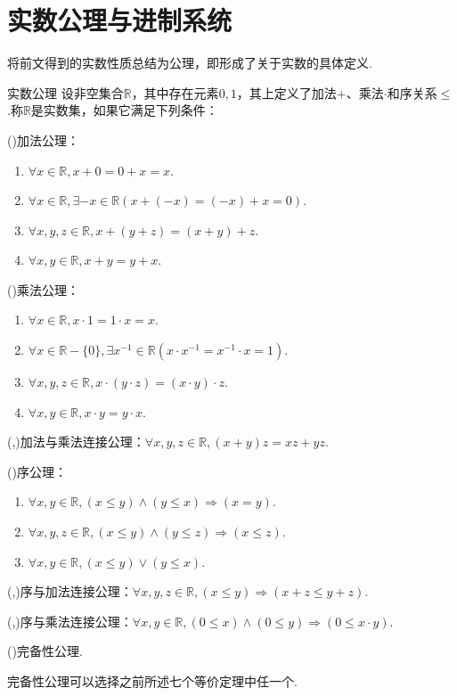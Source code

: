 \documentclass[lang=cn, zihao=5]{elegantbook}
\newcommand{\ssb}[1]{\left( #1 \right)}
\newcommand{\R}{\mathbb{R}}
\begin{document}
\section{实数公理与进制系统}

将前文得到的实数性质总结为公理，即形成了关于实数的具体定义.

\begin{axiom}{实数公理}
	设非空集合$\R$，其中存在元素$0,1$，其上定义了加法$+$、乘法$\cdot$和序关系$\leq$.称$\R$是实数集，如果它满足下列条件：
	
	(\uppercase\expandafter{})加法公理：
	\begin{enumerate}
		\item $\forall x \in \R ,x+0=0+x=x$.
		\item $\forall x \in \R ,\exists -x \in \R \ssb{x+(-x)=(-x)+x=0}$.
		\item $\forall x,y,z \in \R ,x+(y+z)=(x+y)+z$.
		\item $\forall x,y \in \R ,x+y=y+x$.
	\end{enumerate}
	
	(\uppercase\expandafter{})乘法公理：
	\begin{enumerate}
		\item $\forall x \in \R ,x \cdot 1=1 \cdot x=x$.
		\item $\forall x \in \R -\{ 0 \} ,\exists x^{-1} \in \R \ssb{x \cdot x^{-1} =x^{-1} \cdot x=1}$.
		\item $\forall x,y,z \in \R ,x \cdot (y \cdot z)=(x \cdot y) \cdot z$.
		\item $\forall x,y \in \R ,x\cdot y=y\cdot x$.
	\end{enumerate}
	
	(\uppercase\expandafter{},\uppercase\expandafter{})加法与乘法连接公理：$\forall x,y,z \in \R ,(x+y)z=xz+yz$.
	
	(\uppercase\expandafter{})序公理：
	\begin{enumerate}
		\item $\forall x,y \in \R ,(x \leq y) \wedge (y \leq x) \Rightarrow (x=y)$.
		\item $\forall x,y,z \in \R ,(x \leq y) \wedge (y \leq z) \Rightarrow (x \leq z)$.
		\item $\forall x,y \in \R ,(x \leq y) \vee (y \leq x)$.
	\end{enumerate}
	
	(\uppercase\expandafter{},\uppercase\expandafter{})序与加法连接公理：$\forall x,y,z \in \R ,(x \leq y)\Rightarrow (x+z \leq y+z)$.
	
	(\uppercase\expandafter{},\uppercase\expandafter{})序与乘法连接公理：$\forall x,y \in \R ,(0\leq x) \wedge (0 \leq y) \Rightarrow (0 \leq x \cdot y)$.
	
	(\uppercase\expandafter{})完备性公理.
\end{axiom}
\begin{remark}
	完备性公理可以选择之前所述七个等价定理中任一个.
\end{remark}
\end{document}
